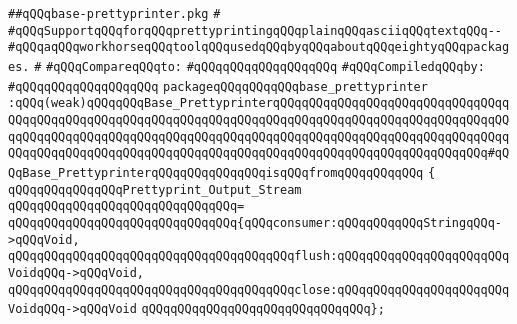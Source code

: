 \label{src/lib/prettyprint/big/src/base-prettyprinter.pkg}
\verb|##qQQqbase-prettyprinter.pkg|\newline
\verb|#|\newline
\verb|#qQQqSupportqQQqforqQQqprettyprintingqQQqplainqQQqasciiqQQqtextqQQq--|\newline
\verb|#qQQqaqQQqworkhorseqQQqtoolqQQqusedqQQqbyqQQqaboutqQQqeightyqQQqpackages.|\newline
\verb|#|\newline
\verb|#qQQqCompareqQQqto:|\newline
\verb|#qQQqqQQqqQQqqQQqqQQq|\newline
\newline
\verb|#qQQqCompiledqQQqby:|\newline
\verb|#qQQqqQQqqQQqqQQqqQQq|\newline
\newline
\newline
\newline
\verb|packageqQQqqQQqqQQqbase_prettyprinter|\newline
\verb|:qQQq(weak)qQQqqQQqBase_PrettyprinterqQQqqQQqqQQqqQQqqQQqqQQqqQQqqQQqqQQqqQQqqQQqqQQqqQQqqQQqqQQqqQQqqQQqqQQqqQQqqQQqqQQqqQQqqQQqqQQqqQQqqQQqqQQqqQQqqQQqqQQqqQQqqQQqqQQqqQQqqQQqqQQqqQQqqQQqqQQqqQQqqQQqqQQqqQQqqQQqqQQqqQQqqQQqqQQqqQQqqQQqqQQqqQQqqQQqqQQqqQQqqQQqqQQqqQQqqQQqqQQq#qQQqBase_PrettyprinterqQQqqQQqqQQqqQQqisqQQqfromqQQqqQQqqQQq|\newline
\verb|{|\newline
\verb|qQQqqQQqqQQqqQQqPrettyprint_Output_Stream|\newline
\verb|qQQqqQQqqQQqqQQqqQQqqQQqqQQqqQQq=|\newline
\verb|qQQqqQQqqQQqqQQqqQQqqQQqqQQqqQQq{qQQqconsumer:qQQqqQQqqQQqStringqQQq->qQQqVoid,|\newline
\verb|qQQqqQQqqQQqqQQqqQQqqQQqqQQqqQQqqQQqqQQqflush:qQQqqQQqqQQqqQQqqQQqqQQqVoidqQQq->qQQqVoid,|\newline
\verb|qQQqqQQqqQQqqQQqqQQqqQQqqQQqqQQqqQQqqQQqclose:qQQqqQQqqQQqqQQqqQQqqQQqVoidqQQq->qQQqVoid|\newline
\verb|qQQqqQQqqQQqqQQqqQQqqQQqqQQqqQQq};|\newline
\newline

